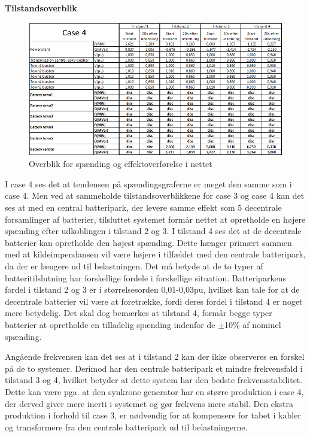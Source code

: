 \textbf{Tilstandsoverblik}
\begin{figure}[H] %
	\centering
	\includegraphics[width=1\textwidth]{figurer/LargeDisturbanceBatterypark/Overview}
	\caption{Overblik for spænding og effektoverførelse i nettet}
	\label{fig:C4Overview}
\end{figure}

I case 4 ses det at tendensen på spændingsgraferne er meget den samme som i case 4. Men ved at sammeholde tilstandsoverblikkene for case 3 og case 4 kan det ses at med en central batteripark, der levere samme effekt som 5 decentrale forsamlinger af batterier, tilsluttet systemet formår nettet at opretholde en højere spænding efter udkoblingen i tilstand 2 og 3. I tilstand 4 ses det at de decentrale batterier kan opretholde den højest spænding. Dette hænger primært sammen med at kildeimpendansen vil være højere i tilfældet med den centrale batteripark, da der er længere ud til belastningen. Det må betyde at de to typer af batteritilslutning har forskellige fordele i forskellige situation. Batteriparkens fordel i tilstand 2 og 3 er i størrelsesorden 0,01-0,03pu, hvilket kan tale for at de decentrale batterier vil være at foretrække, fordi deres fordel i tilstand 4 er noget mere betydelig. Det skal dog bemærkes at tilstand 4, formår begge typer batterier at opretholde en tilladelig spænding indenfor de $\pm$10\% af nominel spænding.

Angående frekvensen kan det ses at i tilstand 2 kan der ikke observeres en forskel på de to systemer. Derimod har den centrale batteripark et mindre frekvensfald i tilstand 3 og 4, hvilket betyder at dette system har den bedste frekvensstabilitet. Dette kan være pga. at den synkrone generator har en større produktion i case 4, der derved giver mere inerti i systemet og gør frekvens mere stabil. Den ekstra produktion i forhold til case 3, er nødvendig for at kompensere for tabet i kabler og transformere fra den centrale batteripark ud til belastningerne.